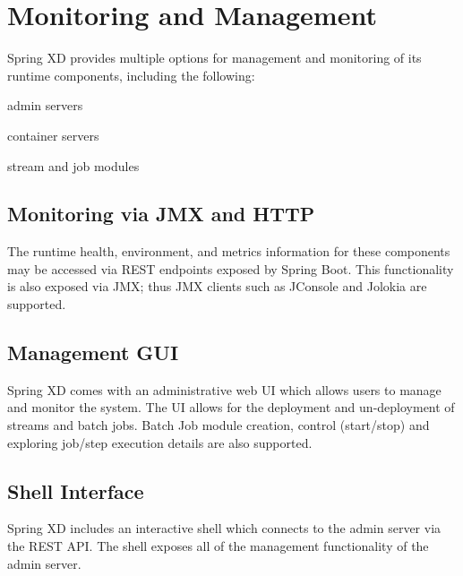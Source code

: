 \section {Monitoring and Management}
Spring XD provides multiple options for management and monitoring of
its runtime components, including the following:\begin{itemize*}
	\item admin servers
	\item container servers
	\item stream and job modules
\end{itemize*}

\subsection {Monitoring via JMX and HTTP}
The runtime health, environment, and metrics information for these components
may be accessed via REST endpoints exposed by Spring Boot\cite{spring-boot}.
This functionality is also exposed via JMX; thus JMX clients such as JConsole
and Jolokia are supported.

\subsection {Management GUI}
Spring XD comes with an administrative web UI which allows users to manage
and monitor the system. The UI allows for the deployment and un-deployment
of streams and batch jobs. Batch Job module creation, control (start/stop)
and exploring job/step execution details are also supported.

\subsection {Shell Interface}
Spring XD includes an interactive shell which connects to the admin server
via the REST API. The shell exposes all of the management functionality
of the admin server.

